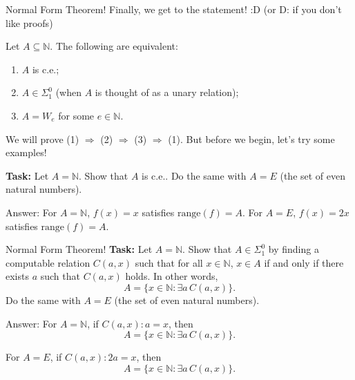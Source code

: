 \documentclass{beamer}
\begin{document}
\begin{frame}{Normal Form Theorem!}
Finally, we get to the statement! :D (or D: if you don't like proofs)

\begin{theorem}
Let $A \subseteq \mathbb N$. The following are equivalent:
\begin{enumerate}
\item $A$ is c.e.;
\item $A \in \Sigma^0_1$ (when $A$ is thought of as a unary relation);
\item $A = W_e$ for some $e \in \mathbb N$.
\end{enumerate}
\end{theorem}

We will prove (1) $\Rightarrow$ (2) $\Rightarrow$ (3) $\Rightarrow$ (1). But before we begin, let's try some examples!

\vspace{2mm}

\textbf{Task:} Let $A = \mathbb N$. Show that $A$ is c.e.. Do the same with $A = E$ (the set of even natural numbers).

\pause

Answer: For $A = \mathbb N$, $f(x) = x$ satisfies $\text{range}(f) = A$. For $A = E$, $f(x) = 2x$ satisfies $\text{range}(f) = A$.
\end{frame}

\begin{frame}{Normal Form Theorem!}
\textbf{Task:} Let $A = \mathbb N$. Show that $A \in \Sigma^0_1$ by finding a computable relation $C(a, x)$ such that for all $x \in \mathbb N$, $x \in A$ if and only if there exists $a$ such that $C(a, x)$ holds. In other words,
$$A = \{x \in \mathbb N: \exists a \, C(a, x)\}.$$ 
Do the same with $A = E$ (the set of even natural numbers).

\vspace{2mm}

\pause

Answer: For $A = \mathbb N$, if $C(a, x): a = x$, then
$$A = \{x \in \mathbb N: \exists a \, C(a, x)\}.$$

For $A = E$, if $C(a, x): 2a = x$, then
$$A = \{x \in \mathbb N: \exists a \, C(a, x)\}.$$
\end{frame}
\end{document}
